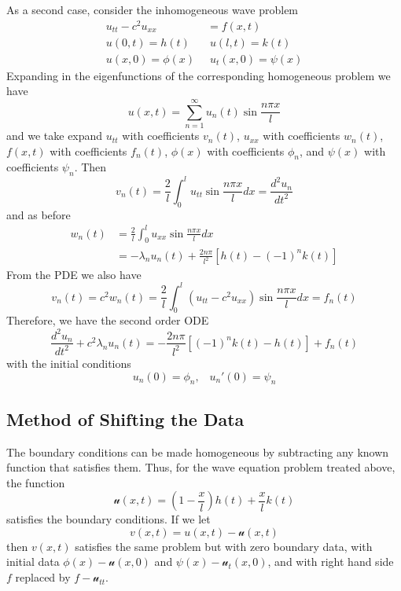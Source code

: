 \documentclass[12pt, a4paper, oneside, openright, titlepage]{book}
\begin{document}
As a second case, consider the inhomogeneous wave problem \begin{align*}
    u_{tt}-c^2u_{xx}&=f(x,t) \\
    u(0,t) = h(t)\;&\;u(l,t) = k(t) \\
    u(x,0) = \phi(x)\;&\;u_t(x,0) = \psi(x)
\end{align*}
Expanding in the eigenfunctions of the corresponding homogeneous problem we have \begin{equation*}
    u(x,t) = \sum_{n=1}^{\infty}u_n(t)\sin\frac{n\pi x}{l}
\end{equation*}
and we take expand $u_{tt}$ with coefficients $v_n(t)$, $u_{xx}$ with coefficients $w_n(t)$, $f(x,t)$ with coefficients $f_n(t)$, $\phi(x)$ with coefficients $\phi_n$, and $\psi(x)$ with coefficients $\psi_n$. Then \begin{equation*}
    v_n(t) = \frac{2}{l}\int_0^lu_{tt}\sin\frac{n\pi x}{l}dx = \frac{d^2u_n}{dt^2}
\end{equation*}
and as before \begin{align*}
    w_n(t) &= \frac{2}{l}\int_0^lu_{xx}\sin\frac{n\pi x}{l}dx \\
    &= -\lambda_nu_n(t) + \frac{2n\pi}{l^2}\left[h(t) - (-1)^nk(t)\right]
\end{align*}
From the PDE we also have \begin{equation*}
    v_n(t) = c^2w_n(t) = \frac{2}{l}\int_0^l(u_{tt}-c^2u_{xx})\sin\frac{n\pi x}{l}dx = f_n(t)
\end{equation*}
Therefore, we have the second order ODE \begin{equation*}
    \frac{d^2u_n}{dt^2} + c^2\lambda_nu_n(t) = -\frac{2n\pi}{l^2}\left[(-1)^nk(t) - h(t)\right] + f_n(t)
\end{equation*}
with the initial conditions \begin{equation*}
    u_n(0) = \phi_n,\;\;\;u_n'(0) = \psi_n
\end{equation*}

\subsection{Method of Shifting the Data}

The boundary conditions can be made homogeneous by subtracting any known function that satisfies them. Thus, for the wave equation problem treated above, the function \begin{equation*}
    \mathscr{u}(x,t) = \left(1-\frac{x}{l}\right)h(t) + \frac{x}{l}k(t)
\end{equation*}
satisfies the boundary conditions. If we let \begin{equation*}
    v(x,t) = u(x,t) - \mathscr{u}(x,t)
\end{equation*}
then $v(x,t)$ satisfies the same problem but with zero boundary data, with initial data $\phi(x) - \mathscr{u}(x,0)$ and $\psi(x) - \mathscr{u}_t(x,0)$, and with right hand side $f$ replaced by $f-\mathscr{u}_{tt}$. 
\end{document}
